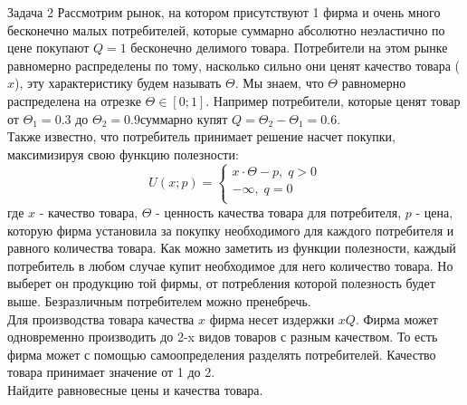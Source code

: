 \begin{mybox}{Задача 2}
    \indent\setlength{\parindent}{1em}\indent\setlength{\parindent}{1em}Рассмотрим рынок, на котором присутствуют 1
    фирма и очень много бесконечно малых потребителей, которые суммарно абсолютно неэластично по цене покупают $Q=1$
    бесконечно делимого товара. Потребители на этом рынке равномерно распределены по тому, насколько сильно они ценят
    качество товара ($x$), эту характеристику будем называть $\Theta$. Мы знаем, что $\Theta$ равномерно
    распределена на отрезке $\Theta\in [0;1]$. Например потребители, которые ценят товар от $\Theta_1=0.3$ до
    $\Theta_2=0.9$суммарно купят $Q=\Theta_2-\Theta_1=0.6$.\\
    \indent\setlength{\parindent}{1em}Также известно, что потребитель принимает решение насчет покупки, максимизируя
    свою функцию полезности:
    $$U(x;p)=\begin{cases}
          x\cdot\Theta-p,\;q>0 \\
          -\infty,\;q=0 \\
    \end{cases}$$
    где $x$ - качество товара, $\Theta$ - ценность качества товара для потребителя, $p$ - цена, которую фирма
    установила за покупку необходимого для каждого потребителя и равного количества товара. Как можно заметить из
    функции полезности, каждый потребитель в любом случае купит необходимое для него количество товара. Но выберет он
    продукцию той фирмы, от потребления которой полезность будет выше. Безразличным потребителем можно пренебречь.\\
    \indent\setlength{\parindent}{1em}Для производства товара качества $x$ фирма несет издержки $xQ$. Фирма может
    одновременно производить до 2-x видов товаров с разным качеством. То есть фирма может с помощью самоопределения
    разделять потребителей. Качество товара принимает значение от 1 до 2.\\
    \indent\setlength{\parindent}{1em}Найдите равновесные цены и качества товара.
\end{mybox}

